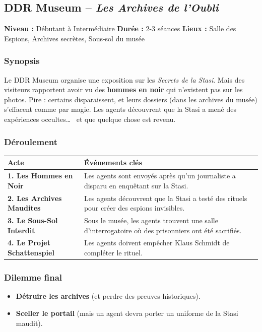 \documentclass[10pt,a5paper,twoside]{book}
\begin{document}
\newpage

\subsection{DDR Museum -- \textit{Les Archives de l'Oubli}}

\begin{shaded}
	\textbf{Niveau :} Débutant à Intermédiaire \quad
	\textbf{Durée :} 2-3 séances \quad
	\textbf{Lieux :} Salle des Espions, Archives secrètes, Sous-sol du musée
\end{shaded}

\subsubsection*{Synopsis}
Le DDR Museum organise une exposition sur les \textit{Secrets de la Stasi}. Mais des visiteurs rapportent avoir vu des \textbf{hommes en noir} qui n'existent pas sur les photos. Pire : certains disparaissent, et leurs dossiers (dans les archives du musée) s'effacent comme par magie. Les agents découvrent que la Stasi a mené des expériences occultes\ldots~  et que quelque chose est revenu.

\subsubsection*{Déroulement}
\begin{center}
	\begin{tabular}{|P{3cm}|P{9cm}|}
	\hline
	\textbf{Acte} 	& \textbf{Événements clés} \\ \hline
	\textbf{1. Les Hommes en Noir} 		& Les agents sont envoyés après qu'un journaliste a disparu en enquêtant sur la Stasi. \\ \hline
	\textbf{2. Les Archives Maudites} 	& Les agents découvrent que la Stasi a testé des rituels pour créer des espions invisibles. \\ \hline
	\textbf{3. Le Sous-Sol Interdit} 	& Sous le musée, les agents trouvent une salle d'interrogatoire où des prisonniers ont été sacrifiés. \\ \hline
	\textbf{4. Le Projet Schattenspiel} & Les agents doivent empêcher Klaus Schmidt de compléter le rituel. \\ \hline
	\end{tabular}
\end{center}

\subsubsection*{Dilemme final}
\begin{itemize}
	\item \textbf{Détruire les archives} (et perdre des preuves historiques).
	\item \textbf{Sceller le portail} (mais un agent devra porter un uniforme de la Stasi maudit).
\end{itemize}
\end{document}
